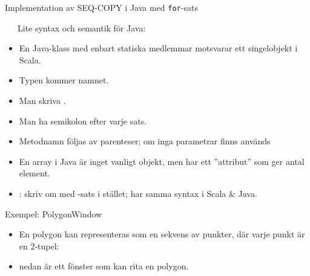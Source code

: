 \begin{Slide}{Implementation av SEQ-COPY i Java med \texttt{for}-sats}
\begin{minipage}{0.55\textwidth}
\vspace{-0.5em}
\end{minipage}
\begin{minipage}{0.44\textwidth}\SlideFontTiny\vspace{-1.5em}
~~~Lite syntax och semantik för Java:
\begin{itemize}
\item En Java-klass med enbart statiska medlemmar motsvarar ett singelobjekt i Scala. 

\item Typen kommer  namnet.

\item Man  skriva .

\item Man  ha semikolon efter varje sats.

\item Metodnamn  följas av parenteser; om inga parametrar finns används \code{()}

\item En array i Java är inget vanligt objekt, men har ett ''attribut''  som ger antal element.

\item {}: skriv om med -sats i stället; har samma syntax i Scala \& Java.

\end{itemize}
\end{minipage}

\end{Slide}



\begin{Slide}{Exempel: PolygonWindow}
\setlength{\leftmargini}{0pt}
\begin{itemize}
\item En polygon kan representeras som en sekvens av punkter, där varje punkt är en 2-tupel:  

\item {} nedan är ett fönster som kan rita en polygon.
\end{itemize}

\vspace{-0.0em}
\pause
\vspace{0em}
\end{Slide}

